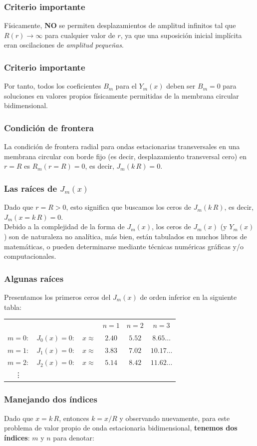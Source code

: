 \begin{frame}
\frametitle{Criterio importante}
Físicamente, \textbf{NO} se permiten desplazamientos de amplitud infinitos tal que $R(r) \to \infty$ para cualquier valor de $r$, ya que una suposición inicial implícita eran oscilaciones de \emph{amplitud pequeñas}. 
\end{frame}
\begin{frame}
\frametitle{Criterio importante}
Por tanto, todos los coeficientes $B_{m}$ para el $Y_{m} (x)$ deben ser $B_{m} = 0$ para soluciones en valores propios físicamente permitidas de la membrana circular bidimensional.
\end{frame}
\begin{frame}
\frametitle{Condición de frontera}
La condición de frontera radial para ondas estacionarias transversales en una membrana circular con borde fijo (es decir, desplazamiento transversal cero) en $r = R$ es $R_{m} (r = R) = 0$, es decir, $J_{m} (k \, R) = 0$.
\end{frame}
\begin{frame}
\frametitle{Las raíces de $J_{m}(x)$}
Dado que $r = R > 0$, esto significa que buscamos los ceros de $J_{m} (k \, R)$, es decir, $J_{m} (x = k \,R) = 0$.
\\
\bigskip
\pause
Debido a la complejidad de la forma de $J_{m} (x)$, los ceros de $J_{m} (x)$ (y $Y_{m} (x)$) son de naturaleza no analítica, más bien, están tabulados en muchos libros de matemáticas, o pueden determinarse mediante técnicas numéricas gráficas y/o computacionales.
\end{frame}
\begin{frame}
\frametitle{Algunas raíces}
Presentamos los primeros ceros del $J_{m} (x)$ de orden inferior en la siguiente tabla:
\fontsize{12}{12}\selectfont
\begin{table}[H]
\centering
\begin{tabular}{c c c c c c}
    & & & $n=1$ & $n=2$ & $n=3$ \\
$m=0:$ & $J_{0}(x)=0:$ & $x \approx$ & $2.40$ & $5.52$ & $8.65  \ldots$ \\
$m=1:$ & $J_{1}(x)=0:$ & $x \approx$ & $3.83$ & $7.02$ & $10.17 \ldots$ \\
$m=2:$ & $J_{2}(x)=0:$ & $x \approx$ & $5.14$ & $8.42$ & $11.62 \ldots$ \\
\vdots
\end{tabular}
\end{table}
\end{frame}
\begin{frame}
\frametitle{Manejando dos índices}
Dado que $x = k \, R$, entonces $k = x / R$ y observando nuevamente, para este problema de valor propio de onda estacionaria bidimensional, \textbf{tenemos dos índices}: $m$ y $n$ para denotar:
\end{frame}
